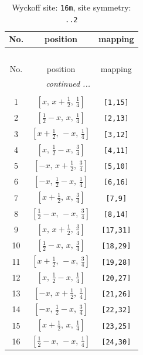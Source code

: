\documentclass[fleqn,8pt]{jsarticle}
\begin{document}
\renewcommand{\arraystretch}{1.2}
\begin{longtable}{ccc}
\caption{Wyckoff site: {\tt 16m}, site symmetry: {\tt ..2}}
 \\
 \hline \hline
No. & position & mapping \\ \hline \endfirsthead

\multicolumn{2}{l}{\tablename\ \thetable{}} \\
 \hline \hline
No. & position & mapping \\ \hline \endhead

 \hline \hline
\multicolumn{2}{r}{\footnotesize\it continued ...} \\ \endfoot

 \hline \hline
\multicolumn{2}{r}{} \\ \endlastfoot

1 & $\left[ x,\, x + \frac{1}{2},\, \frac{1}{4} \right]$ & {\tt [1,15]} \\ \hline
2 & $\left[ \frac{1}{2} - x,\, x,\, \frac{1}{4} \right]$ & {\tt [2,13]} \\ \hline
3 & $\left[ x + \frac{1}{2},\, - x,\, \frac{1}{4} \right]$ & {\tt [3,12]} \\ \hline
4 & $\left[ x,\, \frac{1}{2} - x,\, \frac{3}{4} \right]$ & {\tt [4,11]} \\ \hline
5 & $\left[ - x,\, x + \frac{1}{2},\, \frac{3}{4} \right]$ & {\tt [5,10]} \\ \hline
6 & $\left[ - x,\, \frac{1}{2} - x,\, \frac{1}{4} \right]$ & {\tt [6,16]} \\ \hline
7 & $\left[ x + \frac{1}{2},\, x,\, \frac{3}{4} \right]$ & {\tt [7,9]} \\ \hline
8 & $\left[ \frac{1}{2} - x,\, - x,\, \frac{3}{4} \right]$ & {\tt [8,14]} \\ \hline
9 & $\left[ x,\, x + \frac{1}{2},\, \frac{3}{4} \right]$ & {\tt [17,31]} \\ \hline
10 & $\left[ \frac{1}{2} - x,\, x,\, \frac{3}{4} \right]$ & {\tt [18,29]} \\ \hline
11 & $\left[ x + \frac{1}{2},\, - x,\, \frac{3}{4} \right]$ & {\tt [19,28]} \\ \hline
12 & $\left[ x,\, \frac{1}{2} - x,\, \frac{1}{4} \right]$ & {\tt [20,27]} \\ \hline
13 & $\left[ - x,\, x + \frac{1}{2},\, \frac{1}{4} \right]$ & {\tt [21,26]} \\ \hline
14 & $\left[ - x,\, \frac{1}{2} - x,\, \frac{3}{4} \right]$ & {\tt [22,32]} \\ \hline
15 & $\left[ x + \frac{1}{2},\, x,\, \frac{1}{4} \right]$ & {\tt [23,25]} \\ \hline
16 & $\left[ \frac{1}{2} - x,\, - x,\, \frac{1}{4} \right]$ & {\tt [24,30]} \\
\end{longtable}
\end{document}
